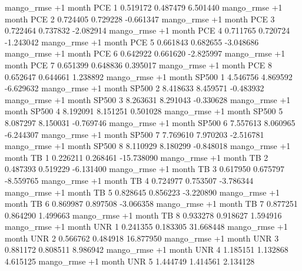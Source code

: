 mango_rmse  +1 month      PCE                 1 0.519172       0.487479           6.501440
mango_rmse  +1 month      PCE                 2 0.724405       0.729228          -0.661347
mango_rmse  +1 month      PCE                 3 0.722464       0.737832          -2.082914
mango_rmse  +1 month      PCE                 4 0.711765       0.720724          -1.243042
mango_rmse  +1 month      PCE                 5 0.661843       0.682655          -3.048686
mango_rmse  +1 month      PCE                 6 0.642922       0.661620          -2.825997
mango_rmse  +1 month      PCE                 7 0.651399       0.648836           0.395017
mango_rmse  +1 month      PCE                 8 0.652647       0.644661           1.238892
mango_rmse  +1 month    SP500                 1 4.546756       4.869592          -6.629632
mango_rmse  +1 month    SP500                 2 8.418633       8.459571          -0.483932
mango_rmse  +1 month    SP500                 3 8.263631       8.291043          -0.330628
mango_rmse  +1 month    SP500                 4 8.192091       8.151251           0.501028
mango_rmse  +1 month    SP500                 5 8.087297       8.150031          -0.769746
mango_rmse  +1 month    SP500                 6 7.557613       8.060965          -6.244307
mango_rmse  +1 month    SP500                 7 7.769610       7.970203          -2.516781
mango_rmse  +1 month    SP500                 8 8.110929       8.180299          -0.848018
mango_rmse  +1 month       TB                 1 0.226211       0.268461         -15.738090
mango_rmse  +1 month       TB                 2 0.487393       0.519229          -6.131400
mango_rmse  +1 month       TB                 3 0.617950       0.675797          -8.559765
mango_rmse  +1 month       TB                 4 0.724977       0.753507          -3.786344
mango_rmse  +1 month       TB                 5 0.828645       0.856223          -3.220890
mango_rmse  +1 month       TB                 6 0.869987       0.897508          -3.066358
mango_rmse  +1 month       TB                 7 0.877251       0.864290           1.499663
mango_rmse  +1 month       TB                 8 0.933278       0.918627           1.594916
mango_rmse  +1 month      UNR                 1 0.241355       0.183305          31.668448
mango_rmse  +1 month      UNR                 2 0.566762       0.484918          16.877950
mango_rmse  +1 month      UNR                 3 0.881172       0.808511           8.986942
mango_rmse  +1 month      UNR                 4 1.185151       1.132868           4.615125
mango_rmse  +1 month      UNR                 5 1.444749       1.414561           2.134128
